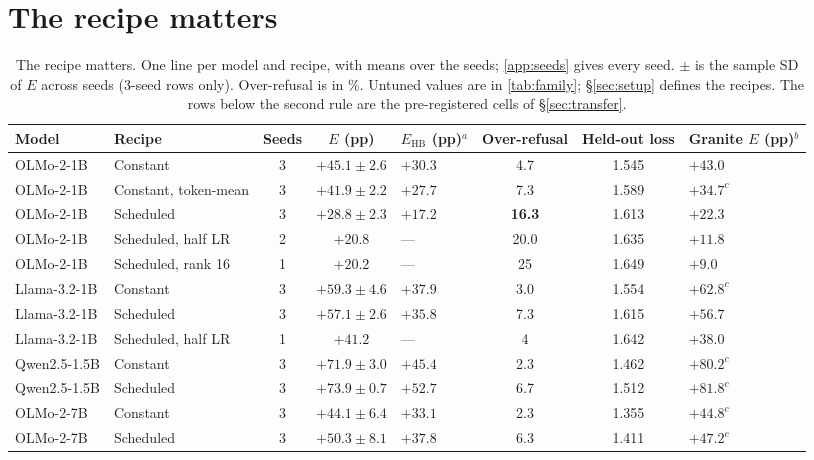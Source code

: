 \documentclass{article}
\newcommand{\Ehb}{E_{\mathrm{HB}}}
\begin{document}
\section{The recipe matters}
\label{sec:recipe}

\begin{table}[t]
  \caption{The recipe matters. One line per model and recipe, with means over
    the seeds; \cref{app:seeds} gives every seed. $\pm$ is the sample SD of $E$
    across seeds (3-seed rows only). Over-refusal is in \%. Untuned values are
    in \cref{tab:family}; \S\ref{sec:setup} defines the recipes. The rows below
    the second rule are the pre-registered cells of \S\ref{sec:transfer}.}
  \label{tab:recipe}
  \centering
  \small
  \setlength{\tabcolsep}{4pt}
  \begin{tabular}{@{}l l c c C{2.2cm} c c C{2.3cm}@{}}
    \toprule
    Model & Recipe & Seeds & $E$ (pp) & $\Ehb$ (pp)$^{a}$ & Over-refusal & Held-out loss & Granite $E$ (pp)$^{b}$ \\
    \midrule
    OLMo-2-1B & Constant & 3 & $+45.1 \pm 2.6$ & $+30.3$ & 4.7 & 1.545 & $+43.0$ \\
    OLMo-2-1B & Constant, token-mean & 3 & $+41.9 \pm 2.2$ & $+27.7$ & 7.3 & 1.589 & $+34.7^{c}$ \\
    OLMo-2-1B & Scheduled & 3 & $\mathbf{+28.8} \pm 2.3$ & $+17.2$ & \textbf{16.3} & 1.613 & $+22.3$ \\
    OLMo-2-1B & Scheduled, half LR & 2 & $+20.8$ & --- & 20.0 & 1.635 & $+11.8$ \\
    OLMo-2-1B & Scheduled, rank 16 & 1 & $+20.2$ & --- & 25 & 1.649 & $+9.0$ \\
    Llama-3.2-1B & Constant & 3 & $+59.3 \pm 4.6$ & $+37.9$ & 3.0 & 1.554 & $+62.8^{c}$ \\
    Llama-3.2-1B & Scheduled & 3 & $+57.1 \pm 2.6$ & $+35.8$ & 7.3 & 1.615 & $+56.7$ \\
    Llama-3.2-1B & Scheduled, half LR & 1 & $+41.2$ & --- & 4 & 1.642 & $+38.0$ \\
    \midrule
    Qwen2.5-1.5B & Constant & 3 & $+71.9 \pm 3.0$ & $+45.4$ & 2.3 & 1.462 & $+80.2^{c}$ \\
    Qwen2.5-1.5B & Scheduled & 3 & $+73.9 \pm 0.7$ & $+52.7$ & 6.7 & 1.512 & $+81.8^{c}$ \\
    OLMo-2-7B & Constant & 3 & $+44.1 \pm 6.4$ & $+33.1$ & 2.3 & 1.355 & $+44.8^{c}$ \\
    OLMo-2-7B & Scheduled & 3 & $+50.3 \pm 8.1$ & $+37.8$ & 6.3 & 1.411 & $+47.2^{c}$ \\

\end{tabular}
\end{table}
\end{document}
